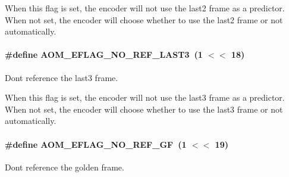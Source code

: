 When this flag is set, the encoder will not use the last2 frame as a predictor. When not set, the encoder will choose whether to use the last2 frame or not automatically. 
\paragraph[{\texorpdfstring{A\+O\+M\+\_\+\+E\+F\+L\+A\+G\+\_\+\+N\+O\+\_\+\+R\+E\+F\+\_\+\+L\+A\+S\+T3}{AOM_EFLAG_NO_REF_LAST3}}]{\setlength{\rightskip}{0pt plus 5cm}\#define A\+O\+M\+\_\+\+E\+F\+L\+A\+G\+\_\+\+N\+O\+\_\+\+R\+E\+F\+\_\+\+L\+A\+S\+T3~(1 $<$$<$ 18)}\hypertarget{group__aom__encoder_gaa4bc8ae2b977b73f0ef57ba428ca1d2c}{}\label{group__aom__encoder_gaa4bc8ae2b977b73f0ef57ba428ca1d2c}


Don\textquotesingle{}t reference the last3 frame. 

When this flag is set, the encoder will not use the last3 frame as a predictor. When not set, the encoder will choose whether to use the last3 frame or not automatically. 
\paragraph[{\texorpdfstring{A\+O\+M\+\_\+\+E\+F\+L\+A\+G\+\_\+\+N\+O\+\_\+\+R\+E\+F\+\_\+\+GF}{AOM_EFLAG_NO_REF_GF}}]{\setlength{\rightskip}{0pt plus 5cm}\#define A\+O\+M\+\_\+\+E\+F\+L\+A\+G\+\_\+\+N\+O\+\_\+\+R\+E\+F\+\_\+\+GF~(1 $<$$<$ 19)}\hypertarget{group__aom__encoder_gaaef6fe76991abf87edd2f296eee999f8}{}\label{group__aom__encoder_gaaef6fe76991abf87edd2f296eee999f8}


Don\textquotesingle{}t reference the golden frame. 

